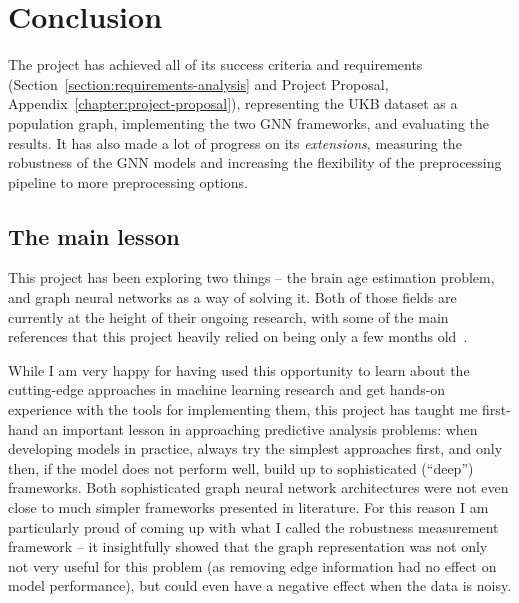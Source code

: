 \chapter{Conclusion}



The project has achieved all of its success criteria and requirements (Section~\ref{section:requirements-analysis} and Project Proposal, Appendix~\ref{chapter:project-proposal}), representing the UKB dataset as a population graph, implementing the two GNN frameworks, and evaluating the results. It has also made a lot of progress on its \textit{extensions}, measuring the robustness of the GNN models and increasing the flexibility of the preprocessing pipeline to more preprocessing options.

\section{The main lesson}
This project has been exploring two things – the brain age estimation problem, and graph neural networks as a way of solving it. Both of those fields are currently at the height of their ongoing research, with some of the main references that this project heavily relied on being only a few months old~\cite{kaufmann2019, niu2019improved, pervaiz2020optimising}.

While I am very happy for having used this opportunity to learn about the cutting-edge approaches in machine learning research and get hands-on experience with the tools for implementing them, this project has taught me first-hand an important lesson in approaching predictive analysis problems: when developing models in practice, always try the simplest approaches first, and only then, if the model does not perform well, build up to sophisticated (``deep'') frameworks. Both sophisticated graph neural network architectures were not even close to much simpler frameworks presented in literature. For this reason I am particularly proud of coming up with what I called the robustness measurement framework – it insightfully showed that the graph representation was not only not very useful for this problem (as removing edge information had no effect on model performance), but could even have a negative effect when the data is noisy.

